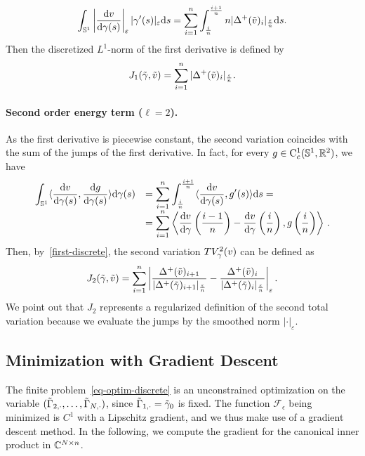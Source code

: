 $$
	\int_{\mathbb{S}^1 }\left|\frac{\mathrm{d} v}{\mathrm{d} \gamma(s)}\right|_\varepsilon|\gamma'(s)|_\varepsilon\mathrm{d} s
	= \sum_{i=1}^n \int_{\frac i n}^{\frac{i+1}{n}}n|\Delta^+(\tilde v)_i|_{\frac{\varepsilon}{n}} \mathrm{d} s.
$$
Then the discretized $L^1$-norm of the first derivative is defined by
$$
	J_1(\tilde{\gamma},\tilde{v})= \sum_{i=1}^n |\Delta^+(\tilde v)_i|_{\frac{\varepsilon}{n}}.
$$


\paragraph{Second order energy term ($\ell=2$).}

As the first derivative is piecewise constant, the second variation coincides with the sum of the jumps of the first derivative. 
In fact, for every $g\in {\rm{C}}^1_c(\mathbb{S}^1, \mathbb{R}^2)$, we have
$$
\begin{array}{ll}
\displaystyle{\int_{\mathbb{S}^1} \langle\frac{\mathrm{d}v}{\mathrm{d}\gamma(s)}, \frac{\mathrm{d}g}{\mathrm{d}\gamma(s)} \rangle\mathrm{d}\gamma(s)} & =  
\displaystyle{\sum_{i=1}^n \int_{\frac i n}^{\frac{i+1}{n}} \langle\frac{\mathrm{d}v}{\mathrm{d}\gamma(s)}, g'(s) \rangle\mathrm{d}s =}\\
& \displaystyle{= \sum_{i=1}^n  \left\langle \frac{\mathrm{d}v}{\mathrm{d}\gamma}\left( \frac{i-1}{n}\right) - \frac{\mathrm{d}v}{\mathrm{d}\gamma}\left( \frac i n\right) , g\left( \frac i n \right)\right\rangle\,.}
\end{array}
$$
Then, by~\eqref{first-discrete}, the second variation $TV_{\gamma}^2(v)$ can be defined as  
\begin{equation}\label{reb-tv2}
	J_2(\tilde{\gamma},\tilde{v}) = 
	\sum_{i=1}^n \left|\frac{\Delta^+(\tilde v)_{i+1}}{|\Delta^+(\tilde{\gamma})_{i+1}|_{\frac{\varepsilon}{n}}} -\frac{\Delta^+(\tilde v)_i}{|\Delta^+(\tilde{\gamma})_i|_{\frac{\varepsilon}{n}}}\right|_\varepsilon. 
\end{equation}
We point out that $J_2$ represents a regularized definition of the second total variation because we evaluate the jumps by the smoothed norm  $|\cdot|_\varepsilon$. 


\subsection{Minimization with Gradient Descent} 

The finite  problem~\eqref{eq-optim-discrete} is an unconstrained optimization on the variable $(\tilde {\Gamma}_{2,\cdot},\ldots,\tilde {\Gamma}_{N,\cdot})$, since $\tilde {\Gamma}_{1,\cdot}=\tilde {\gamma}_0$ is fixed. The function $\mathcal{F}_\epsilon$ being minimized is $C^1$ with a Lipschitz gradient, and we thus make use of a gradient descent method. In the following, we compute the  gradient for the canonical inner product in $\mathbb{C}^{N \times n}$.

